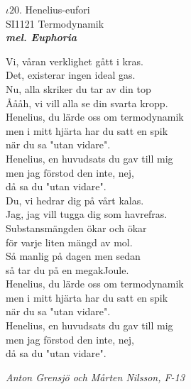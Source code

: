 \documentclass[a6paper,10pt]{article}
\newcommand{\mel}[1]{\small\textbf{\textit{mel. #1 \\}}}
\begin{document}
\setlength{\oddsidemargin}{-0.47in}
\noindent
\begin{center}
\Large $\iota20$. Henelius-eufori \\
\footnotesize SI1121 Termodynamik\\
\mel{Euphoria}
\end{center}
Vi, våran verklighet gått i kras. \\
Det, existerar ingen ideal gas. \\
Nu, alla skriker du tar av din top \\
Åååh, vi vill alla se din svarta kropp.
\vspace{5pt} \\
Henelius, du lärde oss om termodynamik \\
men i mitt hjärta har du satt en spik \\
när du sa "utan vidare".
\vspace{5pt} \\
Henelius, en huvudsats du gav till mig \\
men jag förstod den inte, nej, \\
då sa du "utan vidare".
\vspace{5pt} \\
Du, vi hedrar dig på vårt kalas. \\
Jag, jag vill tugga dig som havrefras. \\
Substansmängden ökar och ökar \\
för varje liten mängd av mol.  \\
Så manlig på dagen men sedan \\
så tar du på en megakJoule.
\vspace{5pt} \\
Henelius, du lärde oss om termodynamik \\
men i mitt hjärta har du satt en spik \\
när du sa "utan vidare".
\vspace{5pt} \\
Henelius, en huvudsats du gav till mig \\
men jag förstod den inte, nej, \\
då sa du "utan vidare".
\begin{flushright}
\textit{Anton Grensjö och Mårten Nilsson, F-13}
\end{flushright}
\end{document}
